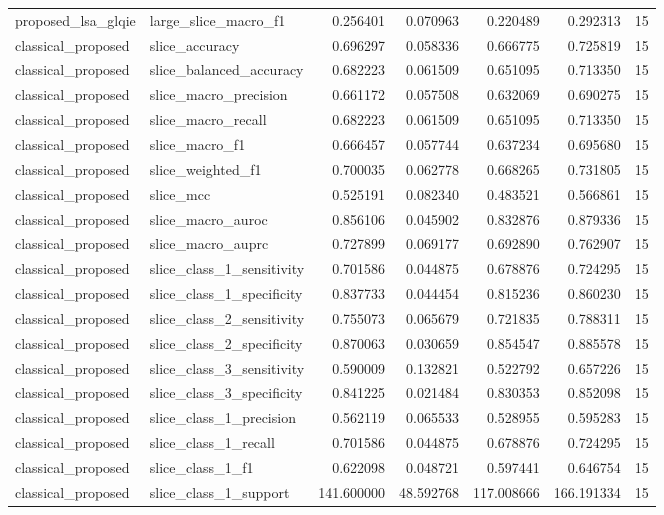 \begin{tabular}{llrrrrr}
proposed_lsa_glqie & large_slice_macro_f1 & 0.256401 & 0.070963 & 0.220489 & 0.292313 & 15 \\
classical_proposed & slice_accuracy & 0.696297 & 0.058336 & 0.666775 & 0.725819 & 15 \\
classical_proposed & slice_balanced_accuracy & 0.682223 & 0.061509 & 0.651095 & 0.713350 & 15 \\
classical_proposed & slice_macro_precision & 0.661172 & 0.057508 & 0.632069 & 0.690275 & 15 \\
classical_proposed & slice_macro_recall & 0.682223 & 0.061509 & 0.651095 & 0.713350 & 15 \\
classical_proposed & slice_macro_f1 & 0.666457 & 0.057744 & 0.637234 & 0.695680 & 15 \\
classical_proposed & slice_weighted_f1 & 0.700035 & 0.062778 & 0.668265 & 0.731805 & 15 \\
classical_proposed & slice_mcc & 0.525191 & 0.082340 & 0.483521 & 0.566861 & 15 \\
classical_proposed & slice_macro_auroc & 0.856106 & 0.045902 & 0.832876 & 0.879336 & 15 \\
classical_proposed & slice_macro_auprc & 0.727899 & 0.069177 & 0.692890 & 0.762907 & 15 \\
classical_proposed & slice_class_1_sensitivity & 0.701586 & 0.044875 & 0.678876 & 0.724295 & 15 \\
classical_proposed & slice_class_1_specificity & 0.837733 & 0.044454 & 0.815236 & 0.860230 & 15 \\
classical_proposed & slice_class_2_sensitivity & 0.755073 & 0.065679 & 0.721835 & 0.788311 & 15 \\
classical_proposed & slice_class_2_specificity & 0.870063 & 0.030659 & 0.854547 & 0.885578 & 15 \\
classical_proposed & slice_class_3_sensitivity & 0.590009 & 0.132821 & 0.522792 & 0.657226 & 15 \\
classical_proposed & slice_class_3_specificity & 0.841225 & 0.021484 & 0.830353 & 0.852098 & 15 \\
classical_proposed & slice_class_1_precision & 0.562119 & 0.065533 & 0.528955 & 0.595283 & 15 \\
classical_proposed & slice_class_1_recall & 0.701586 & 0.044875 & 0.678876 & 0.724295 & 15 \\
classical_proposed & slice_class_1_f1 & 0.622098 & 0.048721 & 0.597441 & 0.646754 & 15 \\
classical_proposed & slice_class_1_support & 141.600000 & 48.592768 & 117.008666 & 166.191334 & 15 \\

\end{tabular}
